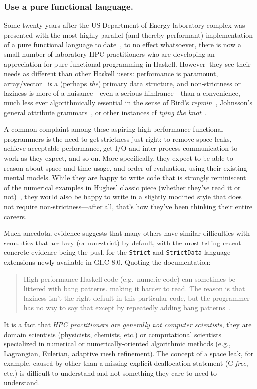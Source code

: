 \documentclass{llncs}
\begin{document}
\subsubsection{Use a pure functional language.}
Some twenty years after the US Department of Energy laboratory complex was
presented with the most highly parallel (and thereby performant)
implementation of a pure functional language to date~\cite{Davis96}, to no
effect whatsoever, there is now a small number of laboratory HPC practitioners
who are developing an appreciation for pure functional programming in Haskell.
However, they see their needs as different than other Haskell users: performance
is paramount, array/vector~\cite{vector} is a (perhaps \emph{the}) primary data
structure, and non-strictness or laziness is more of a nuisance---even a
serious hindrance---than a convenience, much less ever algorithmically
essential in the sense of Bird's \emph{repmin}~\cite{Bird84},
Johnsson's general attribute grammars~\cite{Johnsson87}, 
or other instances of \emph{tying the knot}~\cite{tying-the-knot}.

A common complaint among these aspiring high-performance functional
programmers is the need to get strictness just right: to remove space leaks,
achieve acceptable performance, get I/O and inter-process communication to work
as they expect, and so on.  More specifically, they expect to be able to
reason about space and time usage, and order of evaluation, using their
existing mental models. While they are happy to write code that is strongly
reminiscent of the numerical examples in Hughes' classic piece (whether
they've read it or not)~\cite{Hughes89}, they would also be happy to write in
a slightly modified style that does not require non-strictness---after all,
that's how they've been thinking their entire careers.

Much anecdotal evidence suggests that many others have similar difficulties
with semantics that are lazy (or non-strict) by default, with the most telling
recent concrete evidence being the push for the \texttt{Strict} and
\texttt{StrictData} language extensions newly available in GHC 8.0.  Quoting
the documentation:
\begin{quote}
  High-performance Haskell code (e.g.\ numeric code) can sometimes be littered
  with bang patterns, making it harder to read. The reason is that laziness
  isn't the right default in this particular code, but the programmer has no
  way to say that except by repeatedly adding bang
  patterns~\cite{strict-strictdata}.
\end{quote}
It is a fact that \emph{HPC practitioners are generally not computer
  scientists}, they are domain scientists (physicists, chemists, etc.) or
computational scientists specialized in numerical or numerically-oriented
algorithmic methods (e.g., Lagrangian, Eulerian, adaptive mesh refinement).
The concept of a space leak, for example, caused by other than a missing
explicit deallocation statement (C \emph{free}, etc.) is difficult to
understand and not something they care to need to understand.
\end{document}
